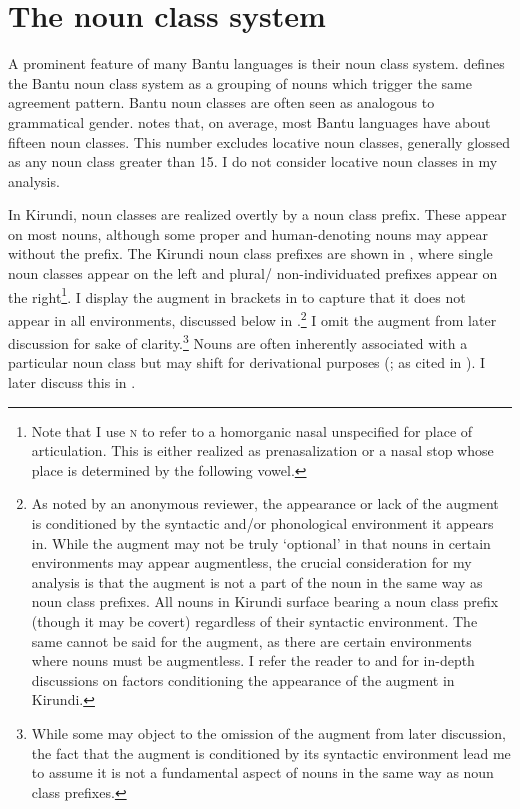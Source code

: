 \documentclass[output=paper,colorlinks,citecolor=brown,
]{langscibook}
\begin{document}
\section{The noun class system}
\label{sec:kinchsular:nounclasses}

A prominent feature of many Bantu languages is their noun class system. \citet{Velde2019} defines the Bantu noun class system as a grouping of nouns which trigger the same agreement pattern. Bantu noun classes are often seen as analogous to grammatical gender. \citet{Maho09} notes that, on average, most Bantu languages have about fifteen noun classes. This number excludes locative noun classes, generally glossed as any noun class greater than 15. I do not consider locative noun classes in my analysis.

In Kirundi, noun classes are realized overtly by a noun class prefix. These appear on most nouns, although some proper and human-denoting nouns may appear without the prefix. The Kirundi noun class prefixes are shown in , where single noun classes appear on the left and plural/ non-individuated prefixes appear on the right\footnote{Note that I use {\textsc{n}} to refer to a homorganic nasal unspecified for place of articulation. This is either realized as prenasalization or a nasal stop whose place is determined by the following vowel.}. I display the augment in brackets in  to capture that it does not appear in all environments, discussed below in .\footnote{As noted by an anonymous reviewer, the appearance or lack of the augment is conditioned by the syntactic and/or phonological environment it appears in. While the augment may not be truly `optional' in that nouns in certain environments may appear augmentless, the crucial consideration for my analysis is that the augment is not a part of the noun in the same way as noun class prefixes. All nouns in Kirundi surface bearing a noun class prefix (though it may be covert) regardless of their syntactic environment. The same cannot be said for the augment, as there are certain environments where nouns must be augmentless. I refer the reader to \citet{ndayiragije2012augment} and \citet{shanks2023spelling} for in-depth discussions on factors conditioning the appearance of the augment in Kirundi.} I omit the augment from later discussion for sake of clarity.\footnote{While some may object to the omission of the augment from later discussion, the fact that the augment is conditioned by its syntactic environment lead me to assume it is not a fundamental aspect of nouns in the same way as noun class prefixes.} Nouns are often inherently associated with a particular noun class but may shift for derivational purposes (\cite{Givon1972}; as cited in \cite{Harjula}). I later discuss this in .
\end{document}
